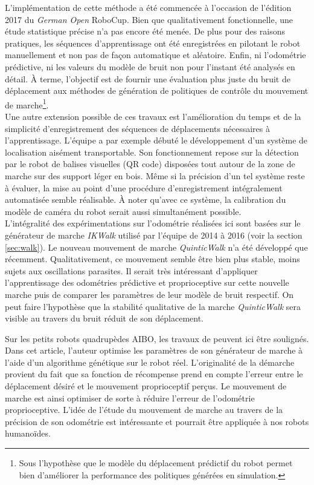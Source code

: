 L'implémentation de cette méthode a été commencée
à l'occasion de l'édition 2017 du \textit{German Open} RoboCup.
Bien que qualitativement fonctionnelle, une étude statistique 
précise n'a pas encore été menée.
De plus pour des raisons pratiques, les séquences d'apprentissage ont été enregistrées 
en pilotant le robot manuellement et non pas de façon automatique et aléatoire.
Enfin, ni l'odométrie prédictive, ni les valeurs du modèle de bruit
non pour l'instant été analysés en détail.
À terme, l'objectif est de fournir une évaluation plus juste du bruit 
de déplacement aux méthodes de génération de politiques de contrôle
du mouvement de marche\footnote{Sous l'hypothèse que le modèle 
du déplacement prédictif du robot permet bien d'améliorer la performance 
des politiques générées en simulation.}.\\

Une autre extension possible de ces travaux est
l'amélioration du temps et de la simplicité d'enregistrement
des séquences de déplacements nécessaires à l'apprentissage.
L'équipe a par exemple débuté le développement
d'un système de localisation aisément transportable.
Son fonctionnement repose sur la détection par 
le robot de balises visuelles (QR code) disposées tout autour de 
la zone de marche sur des support léger en bois.
Même si la précision d'un tel système reste à évaluer,
la mise au point d'une procédure d'enregistrement intégralement 
automatisée semble réalisable.
À noter qu'avec ce système, la calibration du modèle de caméra
du robot serait aussi simultanément possible.\\

L'intégralité des expérimentations sur l'odométrie
réalisées ici sont basées sur le générateur de marche \textit{IKWalk}
utilisé par l'équipe de 2014 à 2016 (voir la section \ref{sec:walk}).
Le nouveau mouvement de marche \textit{QuinticWalk} n'a été développé que récemment.
Qualitativement, ce mouvement semble être bien plus stable, 
moins sujets aux oscillations parasites.
Il serait très intéressant d'appliquer l'apprentissage des odométries
prédictive et proprioceptive sur cette nouvelle marche puis de comparer
les paramètres de leur modèle de bruit respectif.
On peut faire l'hypothèse que la stabilité qualitative de la marche
\textit{QuinticWalk} sera visible au travers du bruit réduit de son déplacement.

Sur les petits robots quadrupèdes AIBO, les travaux de
\cite{rofer_evolutionary_2004} peuvent ici être soulignés.
Dans cet article, l'auteur optimise les paramètres de son générateur
de marche à l'aide d'un algorithme génétique sur le robot réel.
L'originalité de la démarche provient du fait que 
sa fonction de récompense prend en compte l'erreur entre
le déplacement désiré et le mouvement proprioceptif perçus.
Le mouvement de marche est ainsi optimiser de sorte à
réduire l'erreur de l'odométrie proprioceptive.
L'idée de l'étude du mouvement de marche au travers de 
la précision de son odométrie est intéressante et 
pourrait être appliquée à nos robots humanoïdes.


